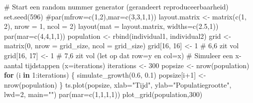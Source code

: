 \documentclass[
  a4paper,
]{scrbook}
\newenvironment{Shaded}{\begin{snugshade}}{\end{snugshade}}
\newcommand{\AttributeTok}[1]{\textcolor[rgb]{0.40,0.45,0.13}{#1}}
\newcommand{\CommentTok}[1]{\textcolor[rgb]{0.37,0.37,0.37}{#1}}
\newcommand{\ControlFlowTok}[1]{\textcolor[rgb]{0.00,0.23,0.31}{\textbf{#1}}}
\newcommand{\DecValTok}[1]{\textcolor[rgb]{0.68,0.00,0.00}{#1}}
\newcommand{\FloatTok}[1]{\textcolor[rgb]{0.68,0.00,0.00}{#1}}
\newcommand{\FunctionTok}[1]{\textcolor[rgb]{0.28,0.35,0.67}{#1}}
\newcommand{\NormalTok}[1]{\textcolor[rgb]{0.00,0.23,0.31}{#1}}
\newcommand{\OtherTok}[1]{\textcolor[rgb]{0.00,0.23,0.31}{#1}}
\newcommand{\SpecialCharTok}[1]{\textcolor[rgb]{0.37,0.37,0.37}{#1}}
\newcommand{\StringTok}[1]{\textcolor[rgb]{0.13,0.47,0.30}{#1}}
\theoremstyle{definition}
\theoremstyle{remark}
\begin{document}
\begin{Shaded}
\begin{Highlighting}[]
\CommentTok{\# Start een random nummer generator (gerandeert reproduceerbaarheid)}
\FunctionTok{set.seed}\NormalTok{(}\DecValTok{596}\NormalTok{)}
\CommentTok{\#par(mfrow=c(1,2),mar=c(3,3,1,1))}
\NormalTok{layout.matrix }\OtherTok{\textless{}{-}} \FunctionTok{matrix}\NormalTok{(}\FunctionTok{c}\NormalTok{(}\DecValTok{1}\NormalTok{, }\DecValTok{2}\NormalTok{), }\AttributeTok{nrow =} \DecValTok{1}\NormalTok{, }\AttributeTok{ncol =} \DecValTok{2}\NormalTok{)}
\FunctionTok{layout}\NormalTok{(}\AttributeTok{mat =}\NormalTok{ layout.matrix, }\AttributeTok{widths=}\FunctionTok{c}\NormalTok{(}\FloatTok{2.5}\NormalTok{,}\DecValTok{1}\NormalTok{))}
\FunctionTok{par}\NormalTok{(}\AttributeTok{mar=}\FunctionTok{c}\NormalTok{(}\DecValTok{4}\NormalTok{,}\DecValTok{4}\NormalTok{,}\DecValTok{1}\NormalTok{,}\DecValTok{1}\NormalTok{))}
\NormalTok{population }\OtherTok{\textless{}{-}} \FunctionTok{rbind}\NormalTok{(individual1, individual2)}
\NormalTok{grid }\OtherTok{\textless{}{-}} \FunctionTok{matrix}\NormalTok{(}\DecValTok{0}\NormalTok{, }\AttributeTok{nrow =}\NormalTok{ grid\_size, }\AttributeTok{ncol =}\NormalTok{ grid\_size)}
\NormalTok{grid[}\DecValTok{16}\NormalTok{, }\DecValTok{16}\NormalTok{] }\OtherTok{\textless{}{-}} \DecValTok{1} \CommentTok{\# 6,6 zit vol}
\NormalTok{grid[}\DecValTok{16}\NormalTok{, }\DecValTok{17}\NormalTok{] }\OtherTok{\textless{}{-}} \DecValTok{1} \CommentTok{\# 7,6 zit vol (let op dat row=y en col=x)}
\CommentTok{\# Simuleer een x{-}aantal tijdstappen (x=iterations)}
\NormalTok{iterations }\OtherTok{\textless{}{-}} \DecValTok{300}
\NormalTok{popsize }\OtherTok{\textless{}{-}} \FunctionTok{nrow}\NormalTok{(population)}
\ControlFlowTok{for}\NormalTok{ (i }\ControlFlowTok{in} \DecValTok{1}\SpecialCharTok{:}\NormalTok{iterations) \{}
  \FunctionTok{simulate\_growth}\NormalTok{(}\FloatTok{0.6}\NormalTok{, }\FloatTok{0.1}\NormalTok{)}
\NormalTok{  popsize[i}\SpecialCharTok{+}\DecValTok{1}\NormalTok{] }\OtherTok{\textless{}{-}} \FunctionTok{nrow}\NormalTok{(population)}
\NormalTok{\}}
\FunctionTok{ts.plot}\NormalTok{(popsize, }\AttributeTok{xlab=}\StringTok{"Tijd"}\NormalTok{, }\AttributeTok{ylab=}\StringTok{"Populatiegrootte"}\NormalTok{, }\AttributeTok{lwd=}\DecValTok{2}\NormalTok{, }\AttributeTok{main=}\StringTok{""}\NormalTok{)}
\FunctionTok{par}\NormalTok{(}\AttributeTok{mar=}\FunctionTok{c}\NormalTok{(}\DecValTok{1}\NormalTok{,}\DecValTok{1}\NormalTok{,}\DecValTok{1}\NormalTok{,}\DecValTok{1}\NormalTok{))}
\FunctionTok{plot\_grid}\NormalTok{(population,}\DecValTok{300}\NormalTok{)}


\end{Highlighting}
\end{Shaded}
\end{document}
